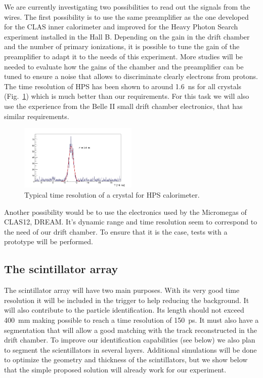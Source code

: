 We are currently investigating two possibilities to read out the signals from the wires.
The first possibility is to use the same preamplifier as the one developed for the CLAS inner calorimeter and improved for the Heavy Photon Search \cite{HPS} experiment installed in the Hall B. Depending on the gain in the drift chamber and the number of primary ionizations, it is possible to tune the gain of the preamplifier to adapt it to the needs of this experiment. More studies will be needed to evaluate how the gains of the chamber and the preamplifier can be tuned to ensure a noise that allows to discriminate clearly electrons from protons. The time resolution of HPS has been shown to around 1.6~ns for all crystals (Fig.~\ref{fig:HPSTreso}) which is much better than our requirements. For this task we will also use the experience from the Belle II small drift chamber electronics, that has similar requirements.

\begin{figure}
  \begin{center}
    \includegraphics[angle=0, width=0.5\textwidth]{./../Detector/fig-chap2/timing_fit_gauss_3pol}
    \caption{Typical time resolution of a crystal for HPS calorimeter.}
    \label{fig:HPSTreso}
  \end{center}
\end{figure}

Another possibility would be to use the electronics used by the Micromegas of 
CLAS12, DREAM. It's dynamic range and time resolution seem to correspond to the 
need of our drift chamber. To ensure that it is the case, tests with a 
prototype will be performed.

\subsection{The scintillator array}

The scintillator array will have two main purposes. With its very good time 
resolution it will be included in the trigger to help reducing the background.  
It will also contribute to the particle identification. Its length should not 
exceed 400~mm making possible to reach a time resolution of 150~ps. It must 
also have a segmentation that will allow a good matching with the track 
reconstructed in the drift chamber. To improve our identification capabilities 
(see below) we also plan to segment the scientillators in several layers.  
Additional simulations will be done to optimize the geometry and thickness of 
the scintillators, but we show below that the simple proposed solution will 
already work for our experiment.

